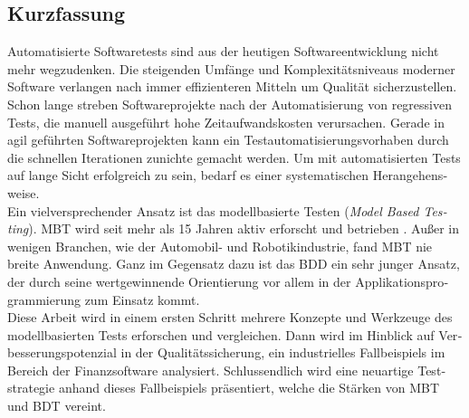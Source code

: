 
\cleardoublepage
{}


%

\begin{otherlanguage}{ngerman}

\chapter*{Kurzfassung}

Automatisierte Softwaretests sind aus der heutigen Softwareentwicklung nicht mehr wegzudenken. Die steigenden Umfänge und Komplexitätsniveaus moderner Software verlangen nach immer effizienteren Mitteln um Qualität sicherzustellen. Schon lange streben Softwareprojekte nach der Automatisierung von regressiven Tests, die manuell ausgeführt hohe Zeitaufwandskosten verursachen. Gerade in agil geführten Softwareprojekten kann ein Testautomatisierungsvorhaben durch die schnellen Iterationen zunichte gemacht werden. Um mit automatisierten Tests auf lange Sicht erfolgreich zu sein, bedarf es einer systematischen Herangehensweise.\\

Ein vielversprechender Ansatz ist das modellbasierte Testen (\textit{Model Based Testing}). \Gls{MBT} wird seit mehr als 15 Jahren aktiv erforscht und betrieben \cite{utting_practical_2007}. Außer in wenigen Branchen, wie der Automobil- und Robotikindustrie, fand \Gls{MBT} nie breite Anwendung. Ganz im Gegensatz dazu ist das \Gls{BDD} ein sehr junger Ansatz, der durch seine wertgewinnende Orientierung vor allem in der Applikationsprogrammierung zum Einsatz kommt.\\

Diese Arbeit wird in einem ersten Schritt mehrere Konzepte und Werkzeuge des modellbasierten Tests erforschen und vergleichen. Dann wird im Hinblick auf Verbesserungspotenzial in der Qualitätssicherung, ein industrielles Fallbeispiels im Bereich der Finanzsoftware analysiert. Schlussendlich wird eine neuartige Teststrategie anhand dieses Fallbeispiels präsentiert, welche die Stärken von \Gls{MBT} und \Gls{BDT} vereint. \\


\end{otherlanguage}
